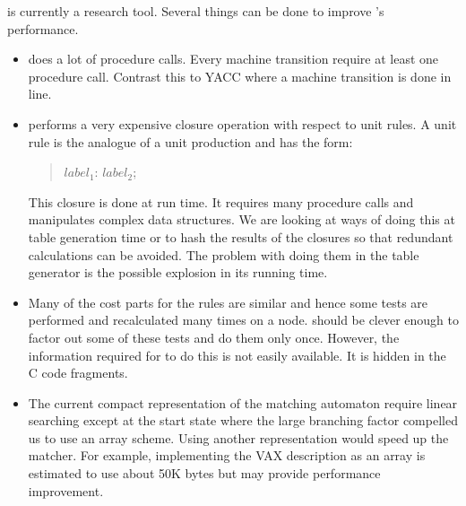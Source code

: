 \Twiglang{} is currently a research tool.  Several things can be done to improve
\twiglang{}'s performance.
\begin{itemize}
\item  \Twiglang{} does a lot of procedure calls.  Every machine transition
require at least one procedure call.  Contrast this to YACC where a machine
transition is done in line.
\item \Twiglang{} performs a very expensive closure operation with respect to
unit rules.  A unit rule is the analogue of a unit production and has the
form:

\begin{verse}
$label_1$: $label_2$;
\end{verse}

\noindent This closure is done at run time.
It requires many procedure calls and manipulates complex data structures.
We are looking at ways of doing this
at table generation time or to hash the results of the closures so that
redundant calculations can be avoided.  The problem with doing them
in the table generator is the possible explosion in its
running time.

\item Many of the cost parts for the rules are similar and hence some
tests are performed and recalculated many times
on a node.  \Twigcomp{} should be clever
enough to factor out some of these tests and do them only once.
However, the information required for \twigcomp{} to do this is not easily
available.  It is hidden in the C code fragments.

\item The current compact
representation of the matching automaton
require linear searching except at the
start state where the large branching factor compelled us to use an
array scheme.  Using another representation would speed up the
matcher.  For example, implementing the VAX description as an array is
estimated to use about 50K bytes but may provide
performance improvement.

\end{itemize}



